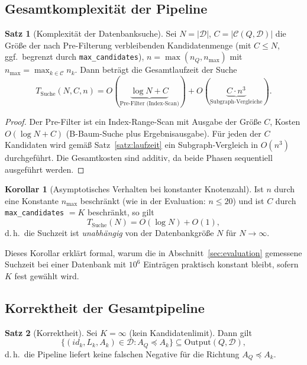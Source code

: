 \documentclass[a4paper,12pt]{article}
\theoremstyle{definition}
\newtheorem{satz}{Satz}
\newtheorem{korollar}{Korollar}
\begin{document}
\subsection{Gesamtkomplexität der Pipeline}

\begin{satz}[Komplexität der Datenbanksuche]
	\label{satz:pipeline}
	Sei $N = |\mathcal{D}|$, $C = |\mathcal{C}(Q,\mathcal{D})|$ die Größe der nach Pre-Filterung verbleibenden Kandidatenmenge (mit $C \le N$, ggf.\ begrenzt durch \texttt{max\_candidates}), $n = \max(n_Q, n_{\max})$ mit $n_{\max} = \max_{k \in \mathcal{C}} n_k$. Dann beträgt die Gesamtlaufzeit der Suche
	\[
	T_{\text{Suche}}(N, C, n) = O(\underbrace{\log N + C}_{\text{Pre-Filter (Index-Scan)}}) + O(\underbrace{C \cdot n^3}_{\text{Subgraph-Vergleiche}}).
	\]
\end{satz}

\begin{proof}
	Der Pre-Filter ist ein Index-Range-Scan mit Ausgabe der Größe $C$, Kosten $O(\log N + C)$ (B-Baum-Suche plus Ergebnisausgabe). Für jeden der $C$ Kandidaten wird gemäß Satz~\ref{satz:laufzeit} ein Subgraph-Vergleich in $O(n^3)$ durchgeführt. Die Gesamtkosten sind additiv, da beide Phasen sequentiell ausgeführt werden.
\end{proof}

\begin{korollar}[Asymptotisches Verhalten bei konstanter Knotenzahl]
	Ist $n$ durch eine Konstante $n_{\max}$ beschränkt (wie in der Evaluation: $n \le 20$) und ist $C$ durch \texttt{max\_candidates} $= K$ beschränkt, so gilt
	\[
	T_{\text{Suche}}(N) = O(\log N) + O(1),
	\]
	d.\,h.\ die Suchzeit ist \emph{unabhängig} von der Datenbankgröße $N$ für $N \to \infty$.
\end{korollar}

Dieses Korollar erklärt formal, warum die in Abschnitt~\ref{sec:evaluation} gemessene Suchzeit bei einer Datenbank mit $10^6$ Einträgen praktisch konstant bleibt, sofern $K$ fest gewählt wird.

\subsection{Korrektheit der Gesamtpipeline}

\begin{satz}[Korrektheit]
	\label{satz:korrektheit}
	Sei $K = \infty$ (kein Kandidatenlimit). Dann gilt
	\[
	\{(id_k,L_k,A_k) \in \mathcal{D} : A_Q \preceq A_k\} \subseteq \mathrm{Output}(Q,\mathcal{D}),
	\]
	d.\,h.\ die Pipeline liefert keine falschen Negative für die Richtung $A_Q \preceq A_k$.
\end{satz}
\end{document}
